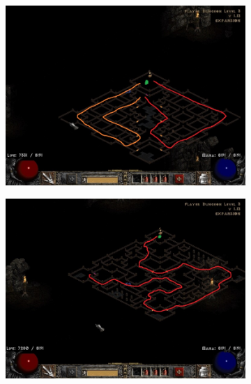 \begin{figure}
	\medskip
	\begin{subfigure}{0.495\hsize}
		\centering
		\includegraphics[width=\hsize]{Assets/FlayerDungeon3_3}
	\end{subfigure}
	\hfill
	\begin{subfigure}{0.495\hsize}
		\centering
		\includegraphics[width=\hsize]{Assets/FlayerDungeon3_4}
	\end{subfigure}


\end{figure}
